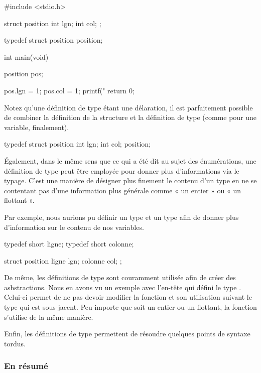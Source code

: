 \begin{C}
#include <stdio.h>

struct position
{
    int lgn;
    int col;
};

typedef struct position position;


int main(void)
{
    position pos;

    pos.lgn = 1;
    pos.col = 1;
    printf("%
    return 0;
}
\end{C}

Notez qu'une définition de type étant une délaration, il est
parfaitement possible de combiner la définition de la structure et la
définition de type (comme pour une variable, finalement).

\begin{C}
typedef struct position
{
    int lgn;
    int col;
} position;
\end{C}

Également, dans le même sens que ce qui a été dit au sujet des
énumérations, une définition de type peut être employée pour donner plus
d'informations via le typage. C'est une manière de désigner plus
finement le contenu d'un type en ne se contentant pas d'une information
plus générale comme « un entier » ou « un flottant ».

Par exemple, nous aurions pu définir un type  et un type
 afin de donner plus d'information sur le contenu de nos
variables.

\begin{C}
typedef short ligne;
typedef short colonne;

struct position
{
    ligne lgn;
    colonne col;
};
\end{C}

De même, les définitions de type sont couramment utilisée afin de créer
des asbstractions. Nous en avons vu un exemple avec l'en-tête
 qui défini le type
. Celui-ci permet de ne pas devoir modifier la fonction
 et son utilisation suivant le type qui est sous-jacent.
Peu importe que  soit un entier ou un flottant, la
fonction  s'utilise de la même manière.

Enfin, les définitions de type permettent de résoudre quelques points de
syntaxe tordus.

\hrulefill

\subsubsection{En résumé}
\label{en-resume-5}

  
  